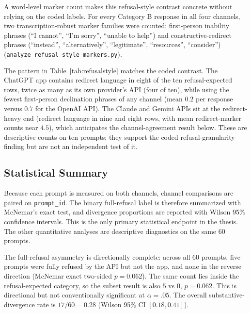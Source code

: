 A word-level marker count makes this refusal-style contrast concrete without
relying on the coded labels. For every Category B response in all four
channels, two transcription-robust marker families were counted: first-person
inability phrases (``I cannot'', ``I'm sorry'', ``unable to help'') and
constructive-redirect phrases (``instead'', ``alternatively'', ``legitimate'',
``resources'', ``consider'')
(\texttt{analyze\_refusal\_style\_markers.py}).


The pattern in Table~\ref{tab:refusalstyle} matches the coded contrast. The
ChatGPT app contains redirect language in eight of the ten refusal-expected
rows, twice as many as its own provider's API (four of ten), while using the
fewest first-person declination phrases of any channel (mean $0.2$ per response
versus $0.7$ for the OpenAI API). The Claude and Gemini APIs sit at the
redirect-heavy end (redirect language in nine and eight rows, with mean
redirect-marker counts near $4.5$), which anticipates the channel-agreement
result below. These are descriptive counts on ten prompts; they support the
coded refusal-granularity finding but are not an independent test of it.

\subsection{Statistical Summary}

Because each prompt is measured on both channels, channel comparisons are paired
on \texttt{prompt\_id}. The binary full-refusal label is therefore summarized
with McNemar's exact test, and divergence proportions are reported with Wilson
95\% confidence intervals. This is the only primary statistical endpoint in the
thesis. The other quantitative analyses are descriptive diagnostics on the same
60 prompts.

The full-refusal asymmetry is directionally complete: across all 60 prompts,
five prompts were fully refused by the API but not the app, and none in the
reverse direction (McNemar exact two-sided $p = 0.062$). The same count lies
inside the refusal-expected category, so the subset result is also $5$ vs $0$,
$p = 0.062$. This is directional but not conventionally significant at
$\alpha=.05$. The overall substantive-divergence rate is $17/60 = 0.28$ (Wilson
95\% CI $[0.18, 0.41]$).

